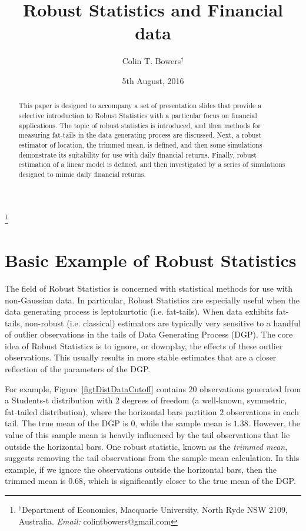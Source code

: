 \documentclass[12pt,a4paper]{amsart}
\begin{document}
\title{Robust Statistics and Financial data}

\author[C. Bowers]{Colin T. Bowers$^\dag$}
\thanks{$^\dag$Department of Economics, Macquarie University, North Ryde NSW 2109, Australia.  \textit{Email:} colintbowers@gmail.com}


\date{5th August, 2016}

\maketitle

\begin{abstract}
This paper is designed to accompany a set of presentation slides that provide a selective introduction to Robust Statistics with a particular focus on financial applications. The topic of robust statistics is introduced, and then methods for measuring fat-tails in the data generating process are discussed. Next, a robust estimator of location, the trimmed mean, is defined, and then some simulations demonstrate its suitability for use with daily financial returns. Finally, robust estimation of a linear model is defined, and then investigated by a series of simulations designed to mimic daily financial returns.
\end{abstract}

\section{Basic Example of Robust Statistics}\label{secBasicExample}

The field of Robust Statistics is concerned with statistical methods for use with non-Gaussian data. In particular, Robust Statistics are especially useful when the data generating process is leptokurtotic (i.e. fat-tails). When data exhibits fat-tails, non-robust (i.e. classical) estimators are typically very sensitive to a handful of outlier observations in the tails of Data Generating Process (DGP). The core idea of Robust Statistics is to ignore, or downplay, the effects of these outlier observations. This usually results in more stable estimates that are a closer reflection of the parameters of the DGP.

For example, Figure~\ref{figtDistDataCutoff} contains $20$ observations generated from a Students-t distribution with $2$ degrees of freedom (a well-known, symmetric, fat-tailed distribution), where the horizontal bars partition $2$ observations in each tail. The true mean of the DGP is $0$, while the sample mean is $1.38$. However, the value of this sample mean is heavily influenced by the tail observations that lie outside the horizontal bars. One robust statistic, known as the \emph{trimmed mean}, suggests removing the tail observations from the sample mean calculation. In this example, if we ignore the observations outside the horizontal bars, then the trimmed mean is $0.68$, which is significantly closer to the true mean of the DGP.
\end{document}
